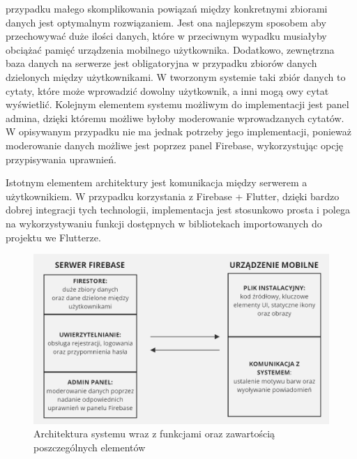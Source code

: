 \begin{itemize}
    przypadku małego skomplikowania powiązań między konkretnymi zbiorami danych
    jest optymalnym rozwiązaniem. Jest ona najlepszym sposobem aby przechowywać
    duże ilości danych, które w przeciwnym wypadku musiałyby obciążać pamięć
    urządzenia mobilnego użytkownika. Dodatkowo, zewnętrzna baza danych na
    serwerze jest obligatoryjna w przypadku zbiorów danych dzielonych między
    użytkownikami. W tworzonym systemie taki zbiór danych to cytaty, które może
    wprowadzić dowolny użytkownik, a inni mogą owy cytat wyświetlić. Kolejnym
    elementem systemu możliwym do implementacji jest panel admina, dzięki
    któremu możliwe byłoby moderowanie wprowadzanych cytatów. W opisywanym
    przypadku nie ma jednak potrzeby jego implementacji, ponieważ moderowanie
    danych możliwe jest poprzez panel Firebase, wykorzystując opcję
    przypisywania uprawnień.
\end{itemize}
Istotnym elementem architektury jest komunikacja między serwerem a
użytkownikiem. W przypadku korzystania z Firebase + Flutter, dzięki bardzo
dobrej integracji tych technologii, implementacja jest stosunkowo prosta i
polega na wykorzystywaniu funkcji dostępnych w bibliotekach importowanych do
projektu we Flutterze.

\begin{figure}[h]
    \centering
    \includegraphics[width=\textwidth]{img/architektura.png}
    \caption{Architektura systemu wraz z funkcjami oraz zawartością poszczególnych elementów}
    \label{architektura}
\end{figure}
